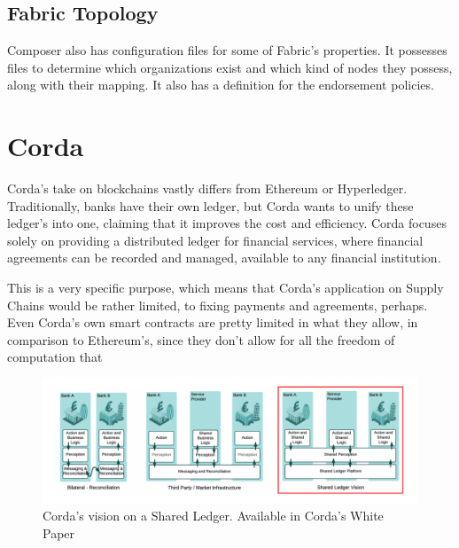 \subsection{Fabric Topology}

Composer also has configuration files for some of Fabric's properties. It possesses files to determine which organizations exist and which kind of nodes they possess, along with their mapping. It also has a definition for the endorsement policies.


\section{Corda}
Corda's take on blockchains vastly differs from Ethereum or Hyperledger. Traditionally, banks have their own ledger, but Corda wants to unify these ledger's into one, claiming that it improves the cost and efficiency. Corda focuses solely on providing a distributed ledger for financial services, where financial agreements can be recorded and managed, available to any financial institution\cite{Brown2016}. 

This is a very specific purpose, which means that Corda's application on Supply Chains would be rather limited, to fixing payments and agreements, perhaps. Even Corda's own smart contracts are pretty limited in what they allow, in comparison to Ethereum's, since they don't allow for all the freedom of computation that


\begin{figure}[h]
\centering
\includegraphics[scale=0.16]{media/corda_shared_ledger.png}
\caption[Corda's vision on a Shared Ledger]{Corda's vision on a Shared Ledger. Available in Corda's White Paper \cite{Brown2016}}
\label{fig:shared_ledger}
\end{figure}

